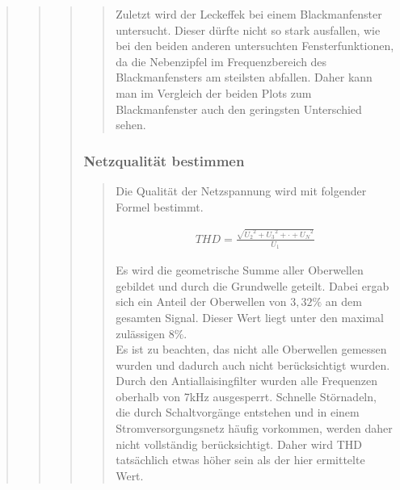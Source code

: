 \begin{quote}
\begin{quote}
\begin{quote}
\begin{quote}
                Zuletzt wird der Leckeffek bei einem Blackmanfenster untersucht.
                Dieser dürfte nicht so stark ausfallen, wie bei den beiden
                anderen untersuchten Fensterfunktionen, da die Nebenzipfel im
                Frequenzbereich des Blackmanfensters am steilsten abfallen.
                Daher kann man im Vergleich der beiden Plots zum Blackmanfenster
                auch den geringsten Unterschied sehen. 
                
                \vspace{1em}

		\end{quote} %
         
        \subsubsection{Netzqualität bestimmen}
    	\begin{quote}
    		Die Qualität der Netzspannung wird mit folgender Formel bestimmt.
    		
    		\begin{align}
                THD = \frac{\sqrt{{U_2}^2+{U_3}^2+ \cdot + {U_N}^2}}{U_1}
            \end{align}
            
            Es wird die geometrische Summe aller Oberwellen gebildet und durch die Grundwelle geteilt.
            Dabei ergab sich ein Anteil der Oberwellen von $3,32\%$ an dem gesamten Signal. Dieser Wert liegt unter den
            maximal zulässigen $8\%$.\\
            Es ist zu beachten, das nicht alle Oberwellen gemessen wurden und dadurch auch nicht berücksichtigt wurden.
            Durch den Antiallaisingfilter wurden alle Frequenzen oberhalb von 7kHz ausgesperrt. Schnelle Störnadeln, die
            durch Schaltvorgänge entstehen und in einem Stromversorgungsnetz häufig vorkommen, werden daher nicht
            vollständig berücksichtigt. Daher wird THD tatsächlich etwas höher sein als der hier ermittelte Wert.
            

\end{quote}
\end{quote}
\end{quote}
\end{quote}

